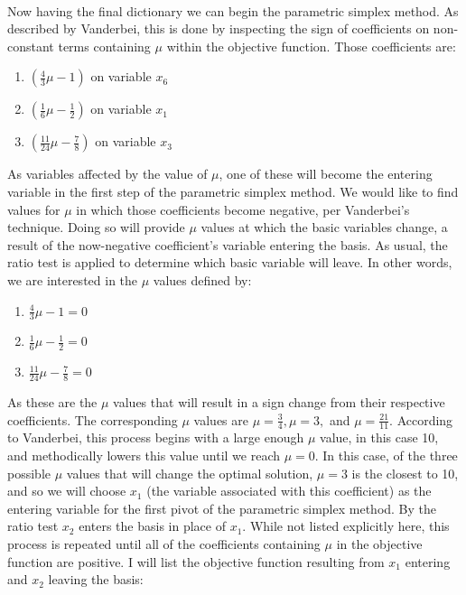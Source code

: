 \documentclass{article}
\begin{document}
\\

Now having the final dictionary we can begin the parametric simplex method. As described by Vanderbei, this is done by inspecting the sign of coefficients on non-constant terms containing $\mu$ within the objective function. Those coefficients are:

\begin{enumerate}
    \item $(\frac{4}{3}\mu -1)$ on variable $x_6$
    \item $(\frac{1}{6}\mu -\frac{1}{2})$ on variable $x_1$
    \item $(\frac{11}{24}\mu -\frac{7}{8})$ on variable $x_3$
\end{enumerate}

As variables affected by the value of $\mu$, one of these will become the entering variable in the first step of the parametric simplex method. We would like to find values for $\mu$ in which those coefficients become negative, per Vanderbei's technique. Doing so will provide $\mu$ values at which the basic variables change, a result of the now-negative coefficient's variable entering the basis. As usual, the ratio test is applied to determine which basic variable will leave. In other words, we are interested in the $\mu$ values defined by:

\begin{enumerate}
    \item $\frac{4}{3}\mu - 1 = 0$
    \item $\frac{1}{6}\mu - \frac{1}{2} = 0$
    \item $\frac{11}{24}\mu - \frac{7}{8} = 0$
\end{enumerate}

As these are the $\mu$ values that will result in a sign change from their respective coefficients. The corresponding $\mu$ values are $\mu = \frac{3}{4}, \mu = 3,$ and $\mu = \frac{21}{11}$. According to Vanderbei, this process begins with a large enough $\mu$ value, in this case 10, and methodically lowers this value until we reach $\mu = 0$. In this case, of the three possible $\mu$ values that will change the optimal solution, $\mu = 3$ is the closest to 10, and so we will choose $x_1$ (the variable associated with this coefficient) as the entering variable for the first pivot of the parametric simplex method. By the ratio test $x_2$ enters the basis in place of $x_1$. While not listed explicitly here, this process is repeated until all of the coefficients containing $\mu$ in the objective function are positive. I will list the objective function resulting from $x_1$ entering and $x_2$ leaving the basis: 
\end{document}
